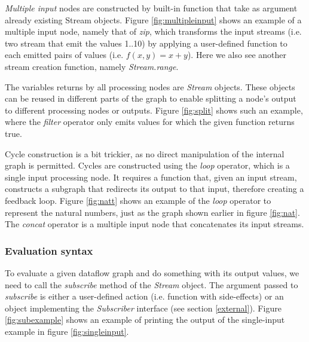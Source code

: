 \documentclass[sigplan,review,anonymous]{acmart}\settopmatter{printfolios=true}
\begin{document}

\textit{Multiple input} nodes are constructed by built-in function that take as argument already existing Stream objects. Figure \ref{fig:multipleinput} shows an example of a multiple input node, namely that of \textit{zip}, which transforms the input streams (i.e. two stream that emit the values 1..10) by applying a user-defined function to each emitted pairs of values (i.e. $f(x,y)=x+y$). Here we also see another stream creation function, namely \textit{Stream.range}.


The variables returns by all processing nodes are \textit{Stream} objects. These objects can be reused in different parts of the graph to enable splitting a node's output to different processing nodes or outputs. Figure \ref{fig:split} shows such an example, where the \textit{filter} operator only emits values for which the given function returns true.


Cycle construction is a bit trickier, as no direct manipulation of the internal graph is permitted. Cycles are constructed using the \textit{loop} operator, which is a single input processing node. It requires a function that, given an input stream, constructs a subgraph that redirects its output to that input, therefore creating a feedback loop. Figure \ref{fig:natt} shows an example of the \textit{loop} operator to represent the natural numbers, just as the graph shown earlier in figure \ref{fig:nat}. The \textit{concat} operator is a multiple input node that concatenates its input streams.


\subsubsection{Evaluation syntax}

To evaluate a given dataflow graph and do something with its output values, we need to call the \textit{subscribe} method of the \textit{Stream} object. The argument passed to \textit{subscribe} is either a user-defined action (i.e. function with side-effects) or an object implementing the \textit{Subscriber} interface (see section \ref{external}). Figure \ref{fig:subexample} shows an example of printing the output of the single-input example in figure \ref{fig:singleinput}.
\end{document}
